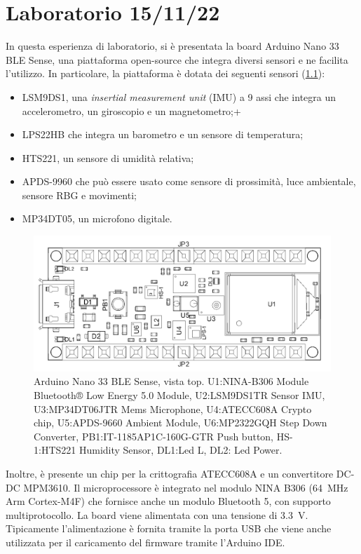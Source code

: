 \chapter{Laboratorio 15/11/22}
In questa esperienza di laboratorio, si è presentata la board Arduino Nano 33 BLE Sense, una piattaforma open-source che integra diversi sensori e ne facilita l'utilizzo. In particolare, la piattaforma è dotata dei seguenti sensori (\Fig\ref{fig:arduino}):
\begin{itemize}
	\item LSM9DS1, una \textit{insertial measurement unit} (IMU) a 9 assi che integra un accelerometro, un giroscopio e un magnetometro;+
	\item LPS22HB che integra un barometro e un sensore di temperatura;
	\item HTS221, un sensore di umidità relativa;
	\item APDS-9960 che può essere usato come sensore di prossimità, luce ambientale, sensore RBG e movimenti;
	\item MP34DT05, un microfono digitale.
\end{itemize}
\begin{figure}[b!]
	\centering
	\includegraphics[width=0.8\linewidth]{./ImageFiles/arduino.png}
	\caption{Arduino Nano 33 BLE Sense, vista top. U1:NINA-B306 Module Bluetooth® Low Energy 5.0 Module, U2:LSM9DS1TR Sensor IMU, U3:MP34DT06JTR Mems Microphone, U4:ATECC608A Crypto chip, U5:APDS-9660 Ambient Module, U6:MP2322GQH Step Down Converter, PB1:IT-1185AP1C-160G-GTR Push button, HS-1:HTS221 Humidity Sensor, DL1:Led L, DL2: Led Power.}
	\label{fig:arduino}
\end{figure}
Inoltre, è presente un chip per la crittografia ATECC608A e un convertitore DC-DC MPM3610. Il microprocessore è integrato nel modulo NINA B306 (\SI{64}{\mega\hertz} Arm Cortex-M4F) che fornisce anche un modulo Bluetooth 5, con supporto multiprotocollo. La board viene alimentata con una tensione di \SI{3.3}{\volt}. Tipicamente l'alimentazione è fornita tramite la porta USB che viene anche utilizzata per il caricamento del firmware tramite l'Arduino IDE.